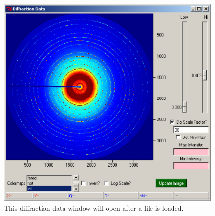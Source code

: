 \begin{figure}
    \centering
    \includegraphics[scale=.75]
    {figures/diffraction_data_window.eps}
    \caption{This diffraction data window will open after 
    a file is loaded.} 
    \label{diffraction_data_window}
\end{figure}

